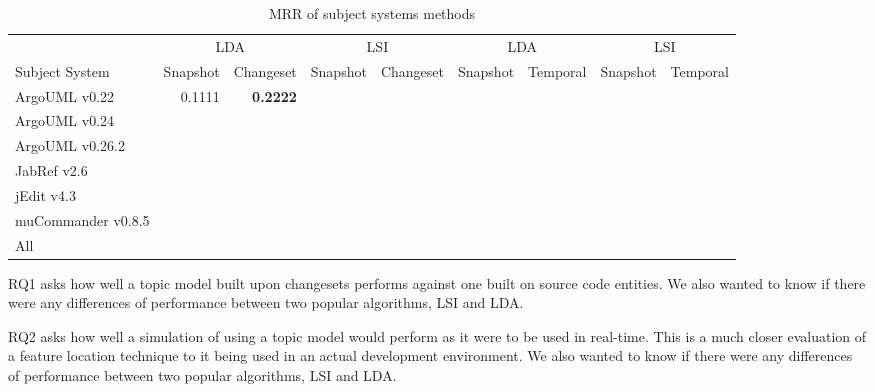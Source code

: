 \begin{table*}[t]
\renewcommand{\arraystretch}{1.3}
\footnotesize
\centering
\caption{MRR of subject systems methods}
\begin{tabular}{l|rr|rr||rr|rr}
    \toprule
                        & \multicolumn{2}{c|}{LDA}      &  \multicolumn{2}{c||}{LSI}    & \multicolumn{2}{c|}{LDA}      &  \multicolumn{2}{c}{LSI}  \\
    Subject System      & Snapshot      & Changeset     & Snapshot      & Changeset     & Snapshot      & Temporal      & Snapshot      & Temporal  \\
    \midrule
    ArgoUML v0.22       & 0.1111        & {\bf 0.2222}  &               &               &               &               &               &           \\
    ArgoUML v0.24       &               &               &               &               &               &               &               &           \\
    ArgoUML v0.26.2     &               &               &               &               &               &               &               &           \\
    JabRef v2.6         &               &               &               &               &               &               &               &           \\
    jEdit v4.3          &               &               &               &               &               &               &               &           \\
    muCommander v0.8.5  &               &               &               &               &               &               &               &           \\
    \midrule
    All                 &               &               &               &               &               &               &               &           \\
    \bottomrule
\end{tabular}
\label{table:mrr:methods}
\end{table*}


RQ1 asks how well a topic model built upon changesets performs against
one built on source code entities.
We also wanted to know if there were any differences of performance
between two popular algorithms, LSI and LDA.


RQ2 asks how well a simulation of using a topic model would perform as
it were to be used in real-time.
This is a much closer evaluation of a feature location technique to it
being used in an actual development environment.
We also wanted to know if there were any differences of performance
between two popular algorithms, LSI and LDA.

